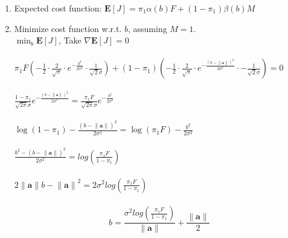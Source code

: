 \documentclass[11pt]{article}
\begin{document}
\begin{itemize}
\begin{enumerate}
    \item Expected cost function: $\mathbf{E}[J] = \pi_1\alpha(b)F+(1-\pi_1)\beta(b)M$
    \item Minimize cost function w.r.t. $b$, assuming $M=1$.\\
    $\min_b \mathbf{E}[J]$, Take $\nabla \mathbf{E}[J] = 0$\\\\
    $\pi_1 F(-\frac{1}{2}\cdot\frac{2}{\sqrt{\pi}}\cdot e^{-\frac{b^2}{2\sigma^2}}\cdot \frac{1}{\sqrt{2}\sigma}) +
    (1-\pi_1)(-\frac{1}{2}\cdot\frac{2}{\sqrt{\pi}}\cdot e^{-\frac{{(b-\lVert \mathbf{a} \rVert)}^2}{2\sigma^2}}\cdot -\frac{1}{\sqrt{2}\sigma})=0$\\\\
    $\frac{1-\pi_1}{\sqrt{2\pi}\sigma} e^{-\frac{{(b-\lVert \mathbf{a} \rVert)}^2}{2\sigma^2}} = \frac{\pi_1 F}{\sqrt{2\pi}\sigma} e^{-\frac{b^2}{2\sigma^2}}$\\\\
    $\log{(1-\pi_1)}-\frac{{(b-\lVert \mathbf{a} \rVert)}^2}{2\sigma^2} =
    \log{(\pi_1F)}-\frac{b^2}{2\sigma^2}$\\\\
    $\frac{b^2-{(b-\lVert \mathbf{a} \rVert)}^2}{2\sigma^2} = log{(\frac{\pi_1F}{1-\pi_1})}$\\\\
    $2\lVert \mathbf{a} \rVert b - {\lVert \mathbf{a} \rVert}^2 = 2\sigma^2log{(\frac{\pi_1F}{1-\pi_1})}$\\\\
    \begin{equation}
        b = \frac{\sigma^2log{(\frac{\pi_1F}{1-\pi_1})}}{\lVert \mathbf{a} \rVert} + \frac{\lVert \mathbf{a} \rVert}{2}
    \end{equation}
    
\end{enumerate}
    
\end{itemize}
\end{document}
